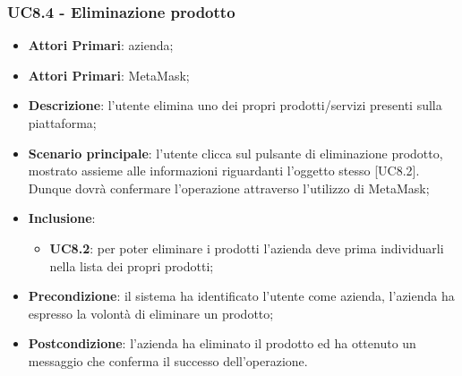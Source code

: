 \subsubsection{UC8.4 - Eliminazione prodotto}
\begin{itemize}
	\item \textbf{Attori Primari}: azienda;
	\item \textbf{Attori Primari}: MetaMask\glo;
	\item \textbf{Descrizione}:
	l'utente elimina uno dei propri prodotti/servizi presenti sulla piattaforma;
	\item \textbf{Scenario principale}: l'utente clicca sul pulsante di eliminazione prodotto, mostrato assieme alle informazioni riguardanti l'oggetto stesso [UC8.2]. Dunque dovrà confermare l'operazione attraverso l'utilizzo di MetaMask\glo;
	\item \textbf{Inclusione}:
	\begin{itemize}
		\item \textbf{UC8.2}: per poter eliminare i prodotti l'azienda deve prima individuarli nella lista dei propri prodotti;
	\end{itemize}
	\item \textbf{Precondizione}: il sistema ha identificato l'utente come azienda, l'azienda ha espresso la volontà di eliminare un prodotto;
	\item \textbf{Postcondizione}: l'azienda ha eliminato il prodotto ed ha ottenuto un messaggio che conferma il successo dell'operazione.
\end{itemize}



